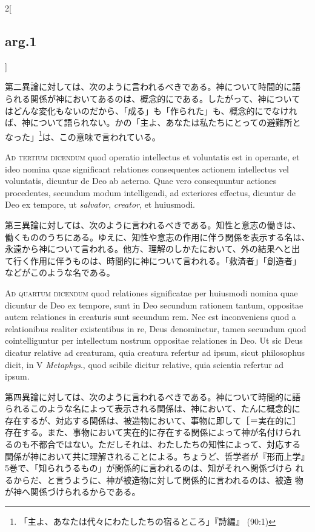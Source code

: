 \documentclass[paper=a4paper,fontsize=10pt,jafontsize=9pt,titlepage]{jlreq}
\begin{document}
\begin{paracol}{2}[\subsection{arg.1}]
\switchcolumn

第二異論に対しては、次のように言われるべきである。神について時間的に語
られる関係が神においてあるのは、概念的にである。したがって、神について
はどんな変化もないのだから、「成る」も「作られた」も、概念的にでなけれ
ば、神について語られない。かの「主よ、あなたは私たちにとっての避難所と
なった」\footnote{「主よ、あなたは代々にわたしたちの宿るところ」『詩編』
(90:1)}は、この意味で言われている。

\switchcolumn*[\subsection{ad.3}]

{\scshape Ad tertium dicendum} quod operatio intellectus et voluntatis
est in operante, et ideo nomina quae significant relationes
consequentes actionem intellectus vel voluntatis, dicuntur de Deo ab
aeterno. Quae vero consequuntur actiones procedentes, secundum modum
intelligendi, ad exteriores effectus, dicuntur de Deo ex tempore, ut
{\itshape salvator}, {\itshape creator}, et huiusmodi.

\switchcolumn

第三異論に対しては、次のように言われるべきである。知性と意志の働きは、
働くもののうちにある。ゆえに、知性や意志の作用に伴う関係を表示する名は、
永遠から神について言われる。他方、理解のしかたにおいて、外の結果へと出
て行く作用に伴うものは、時間的に神について言われる。「救済者」「創造者」
などがこのような名である。

\switchcolumn*[\subsection{ad.4}]

{\scshape Ad quartum dicendum} quod relationes significatae per
huiusmodi nomina quae dicuntur de Deo ex tempore, sunt in Deo secundum
rationem tantum, oppositae autem relationes in creaturis sunt secundum
rem. Nec est inconveniens quod a relationibus realiter existentibus in
re, Deus denominetur, tamen secundum quod cointelliguntur per
intellectum nostrum oppositae relationes in Deo. Ut sic Deus dicatur
relative ad creaturam, quia creatura refertur ad ipsum, sicut
philosophus dicit, in V {\itshape Metaphys}., quod scibile dicitur
relative, quia scientia refertur ad ipsum.

\switchcolumn

第四異論に対しては、次のように言われるべきである。神について時間的に語
られるこのような名によって表示される関係は、神において、たんに概念的に
存在するが、対応する関係は、被造物において、事物に即して［＝実在的に］
存在する。また、事物において実在的に存在する関係によって神が名付けられ
るのも不都合ではない。ただしそれは、わたしたちの知性によって、対応する
関係が神において共に理解されることによる。ちょうど、哲学者が『形而上学』
5巻で、「知られうるもの」が関係的に言われるのは、知がそれへ関係づけら
れるからだ、と言うように、神が被造物に対して関係的に言われるのは、被造
物が神へ関係づけられるからである。


\end{paracol}
\end{document}

